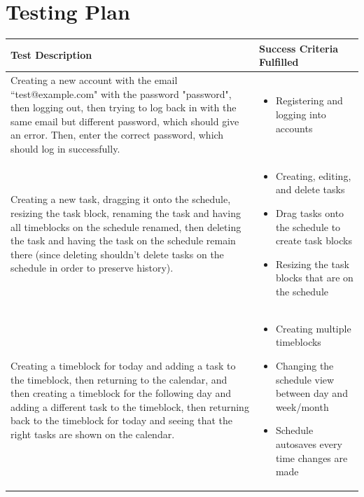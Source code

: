 \documentclass[12pt]{report}
\begin{document}
\newpage

\section*{Testing Plan}
\begin{xltabular}{\linewidth}{|X|X|}
	\hline
	\textbf{Test Description}
	&
	\textbf{Success Criteria Fulfilled}
	\\\hline
	Creating a new account with the email ``test@example.com" with the password "password", then logging out, then trying to log back in with the same email but different password, which should give an error. Then, enter the correct password, which should log in successfully.
	&
	\vspace{-5mm}
	\begin{itemize}
		\item Registering and logging into accounts
	\end{itemize}
	\\\hline
	Creating a new task, dragging it onto the schedule, resizing the task block, renaming the task and having all timeblocks on the schedule renamed, then deleting the task and having the task on the schedule remain there (since deleting shouldn't delete tasks on the schedule in order to preserve history).
	&
	\vspace{-5mm}
	\begin{itemize}
		\item Creating, editing, and delete tasks
		\item Drag tasks onto the schedule to create task blocks
		\item Resizing the task blocks that are on the schedule
	\end{itemize}
	\\\hline
	Creating a timeblock for today and adding a task to the timeblock, then returning to the calendar, and then creating a timeblock for the following day and adding a different task to the timeblock, then returning back to the timeblock for today and seeing that the right tasks are shown on the calendar.
	&
	\vspace{-5mm}
	\begin{itemize}
		\item Creating multiple timeblocks
		\item Changing the schedule view between day and week/month
		\item Schedule autosaves every time changes are made
	\end{itemize}
	\\\hline

\end{xltabular}
\end{document}
